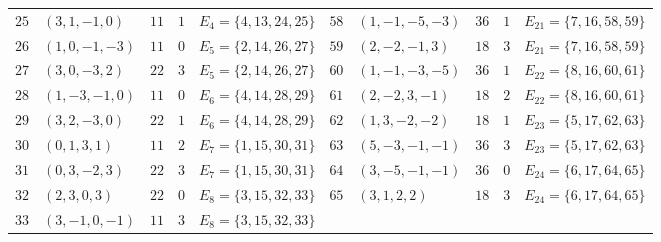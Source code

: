 \documentclass[aps,pra,reprint,superscriptaddress,longbibliography,nofootinbib,floatfix,10pt]{revtex4-2}
\theoremstyle{definition}
\begin{document}
\begin{longtable}{rllll|rllll}
$25$ & $(3,1,-1,0)$    & $11$ & $1$ & $E_4=\{4,13,24,25\}$ &
$58$ & $(1,-1,-5,-3)$  & $36$ & $1$ & $E_{21}=\{7,16,58,59\}$ \\*
$26$ & $(1,0,-1,-3)$   & $11$ & $0$ & $E_5=\{2,14,26,27\}$ &
$59$ & $(2,-2,-1,3)$   & $18$ & $3$ & $E_{21}=\{7,16,58,59\}$ \\*
$27$ & $(3,0,-3,2)$    & $22$ & $3$ & $E_5=\{2,14,26,27\}$ &
$60$ & $(1,-1,-3,-5)$  & $36$ & $1$ & $E_{22}=\{8,16,60,61\}$ \\*
$28$ & $(1,-3,-1,0)$   & $11$ & $0$ & $E_6=\{4,14,28,29\}$ &
$61$ & $(2,-2,3,-1)$   & $18$ & $2$ & $E_{22}=\{8,16,60,61\}$ \\*
$29$ & $(3,2,-3,0)$    & $22$ & $1$ & $E_6=\{4,14,28,29\}$ &
$62$ & $(1,3,-2,-2)$   & $18$ & $1$ & $E_{23}=\{5,17,62,63\}$ \\*
$30$ & $(0,1,3,1)$     & $11$ & $2$ & $E_7=\{1,15,30,31\}$ &
$63$ & $(5,-3,-1,-1)$  & $36$ & $3$ & $E_{23}=\{5,17,62,63\}$ \\*
$31$ & $(0,3,-2,3)$    & $22$ & $3$ & $E_7=\{1,15,30,31\}$ &
$64$ & $(3,-5,-1,-1)$  & $36$ & $0$ & $E_{24}=\{6,17,64,65\}$ \\*
$32$ & $(2,3,0,3)$     & $22$ & $0$ & $E_8=\{3,15,32,33\}$ &
$65$ & $(3,1,2,2)$     & $18$ & $3$ & $E_{24}=\{6,17,64,65\}$ \\*
$33$ & $(3,-1,0,-1)$   & $11$ & $3$ & $E_8=\{3,15,32,33\}$ &
     &                 &      &     &
\end{longtable}
\endgroup
\end{document}
